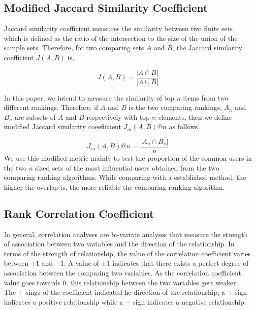 \documentclass[sigconf]{acmart}
\begin{document}
\subsection{Modified Jaccard Similarity Coefficient}
Jaccard similarity coefficient measures the similarity between two finite sets which is defined as the ratio of the intersection to the size of the union of the sample sets. Therefore, for two comparing sets $A$ and $B$, the Jaccard similarity coefficient $J(A,B)$ is,

\begin{equation}
J(A,B) = \dfrac{|A \cap B|}{|A \cup B|}
\end{equation}

In this paper, we intend to measure the similarity of top $n$ items from two different rankings. Therefore, if $A$ and $B$ is the two comparing rankings, $A_n$ and $B_n$ are subsets of $A$ and $B$ respectively with top $n$ elements, then we define modified Jaccard similarity coeefiicient $J_m(A,B)@n$ as follows,

\begin{equation}
J_m(A,B)@n = \dfrac{|A_n \cap B_n|}{n}
\label{modified jaccard index}
\end{equation}
We use this modified metric mainly to test the proportion of the common users in the two $n$ sized sets of the most influential users obtained from the two comparing ranking algorithms. While comparing with a established method, the higher the overlap is, the more reliable the comparing ranking algorithm.


\subsection{Rank Correlation Coefficient}

In general, correlation analyses are bi-variate analyses that measure the strength of association between two variables and the direction of the relationship. In terms of the strength of relationship, the value of the correlation coefficient varies between $+1$ and $-1$. A value of $\pm 1$ indicates that there exists a perfect degree of association between the comparing two variables. As the correlation coefficient value goes towards $0$, this relationship between the two variables gets weaker. The $\pm$ sings of the coefficient indicated he direction of the relationship; a $+$ sign indicates a positive relationship while a $-$ sign indicates a negative relationship.

\end{document}

